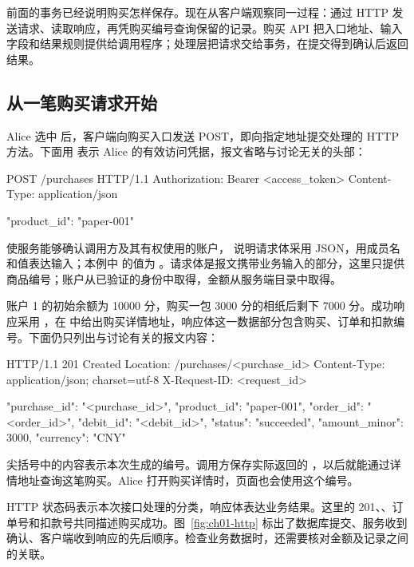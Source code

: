 前面的事务已经说明购买怎样保存。现在从客户端观察同一过程：通过 HTTP 发送请求、读取响应，再凭购买编号查询保留的记录。购买 API 把入口地址、输入字段和结果规则提供给调用程序；处理层把请求交给事务，在提交得到确认后返回结果。

\subsection*{从一笔购买请求开始}

Alice 选中  后，客户端向购买入口发送 POST，即向指定地址提交处理的 HTTP 方法。下面用  表示 Alice 的有效访问凭据，报文省略与讨论无关的头部：

\begin{BookCode}
POST /purchases HTTP/1.1
Authorization: Bearer <access_token>
Content-Type: application/json

{"product_id": "paper-001"}
\end{BookCode}

 使服务能够确认调用方及其有权使用的账户， 说明请求体采用 JSON，用成员名和值表达输入；本例中  的值为 。请求体是报文携带业务输入的部分，这里只提供商品编号；账户从已验证的身份中取得，金额从服务端目录中取得。

账户 1 的初始余额为 10000 分，购买一包 3000 分的相纸后剩下 7000 分。成功响应采用 ，在  中给出购买详情地址，响应体这一数据部分包含购买、订单和扣款编号。下面仍只列出与讨论有关的报文内容：

\begin{BookCode}
HTTP/1.1 201 Created
Location: /purchases/<purchase_id>
Content-Type: application/json; charset=utf-8
X-Request-ID: <request_id>

{
  "purchase_id": "<purchase_id>",
  "product_id": "paper-001",
  "order_id": "<order_id>",
  "debit_id": "<debit_id>",
  "status": "succeeded",
  "amount_minor": 3000,
  "currency": "CNY"
}
\end{BookCode}

尖括号中的内容表示本次生成的编号。调用方保存实际返回的 ，以后就能通过详情地址查询这笔购买。Alice 打开购买详情时，页面也会使用这个编号。

HTTP 状态码表示本次接口处理的分类，响应体表达业务结果。这里的 201、、订单号和扣款号共同描述购买成功。图~\ref{fig:ch01-http} 标出了数据库提交、服务收到确认、客户端收到响应的先后顺序。检查业务数据时，还需要核对金额及记录之间的关联。


